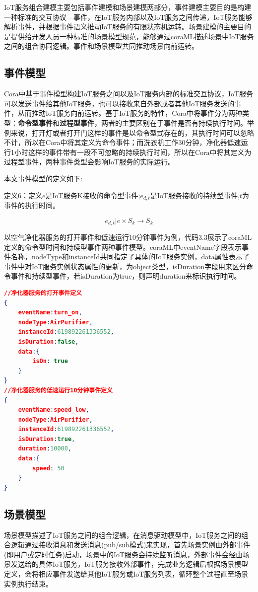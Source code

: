 \documentclass[winfonts,master,twoside]{njuthesis}
\begin{document}
IoT服务组合建模主要包括事件建模和场景建模两部分，事件建模主要目的是构建一种标准的交互协议—事件，在IoT服务内部以及IoT服务之间传递，IoT服务能够解析事件，并根据事件语义推动IoT服务的有限状态机运转。场景建模的主要目的是提供给开发人员一种标准的场景模型规范，能够通过coraML描述场景中IoT服务之间的组合协同逻辑。事件和场景模型共同推动场景向前运转。

\subsection{事件模型}
Cora中基于事件模型构建IoT服务之间以及IoT服务内部的标准交互协议，IoT服务可以发送事件给其他IoT服务，也可以接收来自外部或者其他IoT服务发送的事件，从而推动IoT服务向前运转。基于IoT服务的特性，Cora中将事件分为两种类型：\textbf{命令型事件}和\textbf{过程型事件}，两者的主要区别在于事件是否有持续执行时间。举例来说，打开灯或者打开门这样的事件是以命令型式存在的，其执行时间可以忽略不计，所以在Cora中将其定义为命令事件；而洗衣机工作30分钟，净化器低速运行1小时这样的事件带有一段不可忽略的持续执行时间，所以在Cora中将其定义为过程型事件，两种事件类型会影响IoT服务的实际运行。

本文事件模型的定义如下:

定义6：定义$e$是IoT服务K接收的命令型事件;$e_{d,t}$是IoT服务接收的持续型事件,$t$为事件的执行时间。

$$ e_{d,t}|e  \times S_k \rightarrow S_k$$

以空气净化器服务的打开事件和低速运行10分钟事件为例，代码3.3展示了coraML定义的命令型时间和持续型事件两种事件模型。coraML中eventName字段表示事件名称，nodeType和instanceId共同指定了具体的IoT服务实例，data属性表示了事件中对IoT服务实例状态属性的更新，为object类型，isDuration字段用来区分命令事件和持续型事件，若isDuration为true，则声明duration来标识执行时间。
\begin{lstlisting}[caption={coraML定义的净化器服务的事件模型},label={lst:airpurifier_event_model},language=json,basicstyle=\footnotesize] 
//净化器服务的打开事件定义
{
    eventName:turn_on,
    nodeType:AirPurifier,
    instanceId:619892261336552,
    isDuration:false,
    data:{
        isOn: true
    }
}
//净化器服务的低速运行10分钟事件定义
{
    eventName:speed_low,
    nodeType:AirPurifier,
    instanceId:619892261336552,
    isDuration:true,
    duration:10000,
    data:{
        speed: 50
    }
}
\end{lstlisting}


\subsection{场景模型}
场景模型描述了IoT服务之间的组合逻辑，在消息驱动模型中，IoT服务之间的组合逻辑通过接收消息和发送消息(pub/sub模式)来实现，首先场景实例由外部事件(即用户或定时任务)启动，场景中的IoT服务会持续监听消息，外部事件会经由场景发送给的具体IoT服务，IoT服务接收外部事件，完成业务逻辑后根据场景模型定义，会将相应事件发送给其他IoT服务或IoT服务列表，循环整个过程直至场景实例执行结束。
\end{document}
